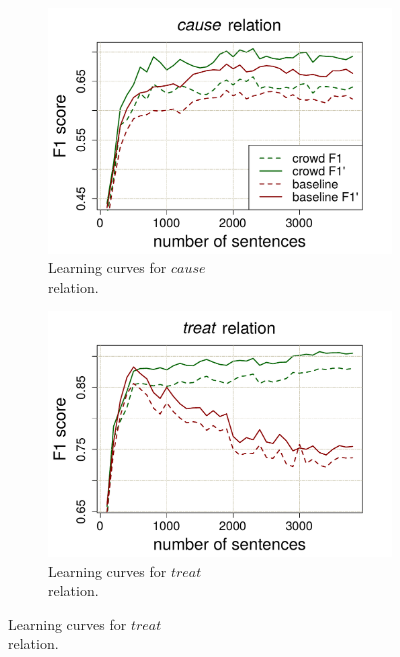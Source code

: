 \begin{figure}[htb!]
\centering
\begin{subfigure}{.5\textwidth}
\includegraphics[width=\linewidth]{img/cause_w.pdf}
\caption{Learning curves for $cause$ \\ relation.}
\label{fig:cause_3800}
\end{subfigure}%
\begin{subfigure}{.5\textwidth}
\includegraphics[width=\linewidth]{img/treat_w.pdf}
\caption{Learning curves for $treat$ \\ relation.}
\label{fig:treat_3800}
\end{subfigure}
\end{figure}

